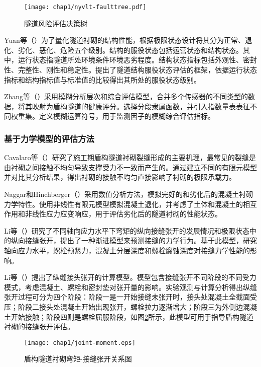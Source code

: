 \begin{figure}[!h]
	\centering
	\texttt{[image: chap1/nyvlt-faulttree.pdf]}
	\caption{隧道风险评估决策树}
	\label{fig:隧道风险评估决策树}
\end{figure}

Yuan等（\citeyear{Yuan2012Assessment}）为了量化隧道衬砌的结构性能，根据极限状态设计将其分为正常、退化、劣化、恶化、危险五个级别。结构的服役状态包括运营状态和结构状态。其中，运行状态指隧道所处环境条件环境恶劣程度。结构状态指标包括外观性、密封性、完整性、刚性和稳定性。提出了隧道结构服役状态评估的框架，依据运行状态指标和结构指标值与标准值的比较得出其所处的服役状态级别。

Zhang等（\citeyear{Zhang2014Fuzzy}）采用模糊分析层次和综合评估模型，合并多个传感器的不同类型的数据，将其映射为盾构隧道的健康评分。选择分段隶属函数，并引入指数量表表征不同权重集。定义模糊运算符号，用于监测因子的模糊综合评估指标。

\subsubsection{基于力学模型的评估方法}

Cavalaro等（\citeyear{Cavalaro2011Structural}）研究了施工期盾构隧道衬砌裂缝形成的主要机理，最常见的裂缝是由衬砌之间接触不均匀导致支撑受力不一致而产生的。通过建立不同的有限元模型并对比其分析结果，得出衬砌的接触不均匀直接影响了衬砌的极限承载力。

Naggar和Hinchberger（\citeyear{Naggar2012Approximate}）采用数值分析方法，模拟完好的和劣化后的混凝土衬砌力学特性。使用非线性有限元模型模拟混凝土退化，并考虑了土体和混凝土的相互作用和非线性应力应变响应，用于评估劣化后的隧道衬砌的性能状态。

Li等（\citeyear{Li2015Experimental}）研究了不同轴向应力水平下弯矩的纵向接缝张开的发展情况和极限状态中的纵向接缝张开，提出了一种渐进模型来预测接缝的力学行为。基于此模型，研究轴向应力水平，螺栓预紧力，混凝土分层深度和螺栓腐蚀深度对接缝力学性能的影响。

Li等（\citeyear{Li2015A}）提出了纵缝接头张开的计算模型。模型包含接缝张开不同阶段的不同受力模式，考虑混凝土、螺栓和密封垫对张开量的影响。实验观测与计算分析得出纵缝张开过程可分为四个阶段：阶段一是一开始接缝未张开时，接头处混凝土全截面受压；阶段二接头处混凝土开始出现张开，螺栓拉力逐渐增大；阶段三为外侧边混凝土开始接触；阶段四则是螺栓屈服阶段，如图\ref{fig:接缝张开与弯矩}所示，此模型可用于指导盾构隧道衬砌的接缝张开评估。

\begin{figure}[!h]
	\centering
	\texttt{[image: chap1/joint-moment.eps]}
	\caption{盾构隧道衬砌弯矩-接缝张开关系图}
	\label{fig:接缝张开与弯矩}
\end{figure}

